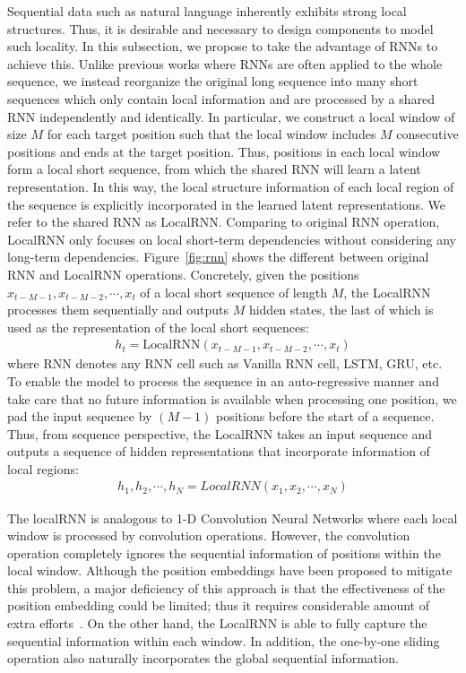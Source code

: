 \documentclass{article} \usepackage{iclr2019_conference,times}
\begin{document}
Sequential data such as natural language inherently exhibits strong local structures. Thus, it is desirable and necessary to design components to model such locality. In this subsection, we propose to take the advantage of RNNs to achieve this. Unlike previous works where RNNs are often applied to the whole sequence, we instead reorganize the original long sequence into many short sequences which only contain local information and are processed by a shared RNN independently and identically. In particular, we construct a local window of size $M$ for each target position such that the local window includes $M$ consecutive positions and ends at the target position. Thus, positions in each local window form a local short sequence, from which the shared RNN will learn a latent representation. In this way, the local structure information of each local region of the sequence is explicitly incorporated in the learned latent representations. We refer to the shared RNN as LocalRNN. Comparing to original RNN operation, LocalRNN only focuses on local short-term dependencies without considering any long-term dependencies. Figure~\ref{fig:rnn} shows the different between original RNN and LocalRNN operations. Concretely, given the positions $x_{t-M-1}, x_{t-M-2}, \cdots, x_{t}$ of a local short sequence of length $M$, the LocalRNN processes them sequentially and outputs $M$ hidden states, the last of which is used as the representation of the local short sequences:
\begin{align}
h_{t} = \text{LocalRNN}(x_{t-M-1}, x_{t-M-2}, \cdots, x_{t})
\end{align}
\noindent where RNN denotes any RNN cell such as Vanilla RNN cell, LSTM, GRU, etc. To enable the model to process the sequence in an auto-regressive manner and take care that no future information is available when processing one position, we pad the input sequence
by $(M - 1)$ positions before the start of a sequence. Thus, from sequence perspective, the LocalRNN takes an input sequence and outputs a sequence of hidden representations that incorporate information of local regions:
\begin{align}
h_1, h_2, \cdots, h_N = LocalRNN(x_1, x_2, \cdots, x_N)
\end{align}

The localRNN is analogous to 1-D Convolution Neural Networks where each local window is processed by convolution operations. However, the convolution operation completely ignores the sequential information of positions within the local window. Although the position embeddings have been proposed to mitigate this problem, a major deficiency of this approach is that the effectiveness of the position embedding could be limited; thus it requires considerable amount of extra efforts~\citep{gehring2017convolutional}. On the other hand, the LocalRNN is able to fully capture the sequential information within each window. In addition, the one-by-one sliding operation also naturally incorporates the global sequential information.
\end{document}

